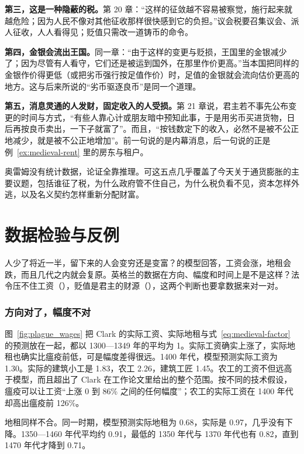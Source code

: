 \textbf{第三，这是一种隐蔽的税。}第 20 章：“这样的征敛越不容易被察觉，施行起来就越危险；因为人民不像对其他征收那样很快感到它的负担。”\cite{oresme1864}议会税要召集议会、派人征收，人人看得见；贬值只需改一道铸币的命令。

\textbf{第四，金银会流出王国。}同一章：“由于这样的变更与贬损，王国里的金银减少了；因为尽管有人看守，它们还是被运到国外，在那里作价更高。”\cite{oresme1864}当本国把同样的金银作价得更低（或把劣币强行按足值作价）时，足值的金银就会流向估价更高的地方。这与后来所说的“劣币驱逐良币”是同一个道理。

\textbf{第五，消息灵通的人发财，固定收入的人受损。}第 21 章说，君主若不事先公布变更的时间与方式，“有些人靠心计或朋友暗中预知此事，于是用劣币买进货物，日后再按良币卖出，一下子就富了”。而且，“按钱数定下的收入，必然不是被不公正地减少，就是被不公正地增加”\cite{oresme1864}。前一句说的是内幕消息，后一句说的正是例~\ref{ex:medieval-rent} 里的房东与租户。

奥雷姆没有统计数据，论证全靠推理。可这五点几乎覆盖了今天关于通货膨胀的主要议题，包括谁征了税，为什么政府管不住自己，为什么税负看不见，资本怎样外逃，以及名义契约怎样重新分配财富。

\section{数据检验与反例}\label{sec:medieval-test}

人少了将近一半，留下来的人会变穷还是变富？的模型回答，工资会涨，地租会跌，而且几代之内就会复原。英格兰的数据在方向、幅度和时间上是不是这样？法令压不住工资（），贬值是君主的财源（），这两个判断也要拿数据来对一对。

\subsubsection{方向对了，幅度不对}
图~\ref{fig:plague_wages} 把 Clark 的实际工资、实际地租与式~\eqref{eq:medieval-factor} 的预测放在一起，都以 1300—1349 年的平均为 1。实际工资确实上涨了，实际地租也确实比瘟疫前低，可是幅度差得很远。1400 年代，模型预测实际工资为 1.30。实际的建筑小工是 1.83，农工 2.26，建筑工匠 1.45。农工的工资不但远高于模型，而且超出了 Clark 在工作论文里给出的整个范围。按不同的技术假设，瘟疫可以让工资“上涨 0 到 86\% 之间的任何幅度”\cite{clark1999wp}；农工的实际工资在 1400 年代却高出瘟疫前 126\%。

地租同样不合。同一时期，模型预测实际地租为 0.68，实际是 0.97，几乎没有下降。1350—1460 年代平均约 0.91，最低的 1350 年代与 1370 年代也有 0.82，直到 1470 年代才降到 0.71。


